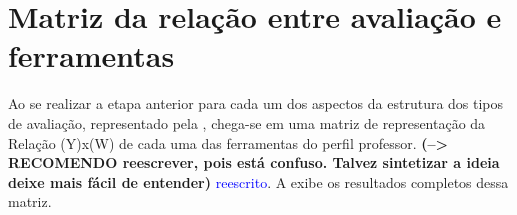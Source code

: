 
\section{Matriz da relação entre avaliação e ferramentas}%


Ao se realizar a etapa anterior para cada um dos aspectos da estrutura dos tipos de avaliação, representado pela , chega-se em uma matriz de representação da Relação (Y)x(W) de cada uma das ferramentas do perfil professor. \textbf{(--> RECOMENDO reescrever, pois está confuso. Talvez sintetizar a ideia deixe mais fácil de entender)} \textcolor{blue} {reescrito}. A  exibe os resultados completos dessa matriz.


